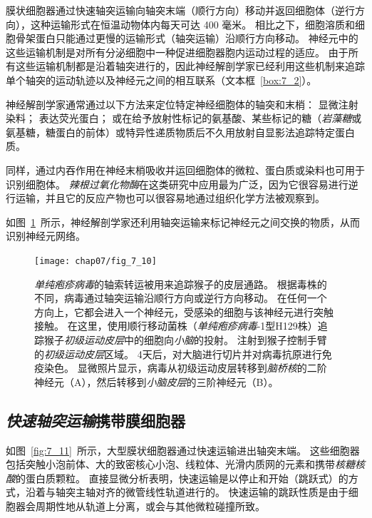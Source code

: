 膜状细胞器通过快速轴突运输向轴突末端（顺行方向）移动并返回细胞体（逆行方向），这种运输形式在恒温动物体内每天可达 400 毫米。
相比之下，细胞溶质和细胞骨架蛋白只能通过更慢的运输形式（轴突运输）沿顺行方向移动。
神经元中的这些运输机制是对所有分泌细胞中一种促进细胞器胞内运动过程的适应。
由于所有这些运输机制都是沿着轴突进行的，因此神经解剖学家已经利用这些机制来追踪单个轴突的运动轨迹以及神经元之间的相互联系（文本框~\ref{box:7_2}）。

\begin{proposition}[利用轴突运输进行神经解剖学追踪] \label{box:7_2}
	
	\quad \quad 神经解剖学家通常通过以下方法来定位特定神经细胞体的轴突和末梢：
	显微注射染料；
	表达荧光蛋白；
	或在给予放射性标记的氨基酸、某些标记的糖（\textit{岩藻糖}或氨基糖，糖蛋白的前体）或特异性递质物质后不久用放射自显影法追踪特定蛋白质。
	
	\quad \quad 同样，通过内吞作用在神经末梢吸收并运回细胞体的微粒、蛋白质或染料也可用于识别细胞体。
	\textit{辣根过氧化物酶}在这类研究中应用最为广泛，因为它很容易进行逆行运输，并且它的反应产物也可以很容易地通过组织化学方法被观察到。
	
	\quad \quad 如图~\ref{fig:7_10}~所示，神经解剖学家还利用轴突运输来标记神经元之间交换的物质，从而识别神经元网络。
	
\end{proposition}


\begin{figure}[htbp]
	\centering
	\texttt{[image: chap07/fig\_7\_10]}
	\caption{\textit{单纯疱疹病毒}的轴索转运被用来追踪猴子的皮层通路。
		根据毒株的不同，病毒通过轴突运输沿顺行方向或逆行方向移动。
		在任何一个方向上，它都会进入一个神经元，受感染的细胞与该神经元进行突触接触。
		在这里，使用顺行移动菌株（\textit{单纯疱疹病毒}-1型H129株）追踪猴子\textit{初级运动皮层}中的细胞向\textit{小脑}的投射。
		注射到猴子控制手臂的\textit{初级运动皮层}区域。
		4天后，对大脑进行切片并对病毒抗原进行免疫染色。
		显微照片显示，病毒从初级运动皮层转移到\textit{脑桥核}的二阶神经元（A），然后转移到\textit{小脑皮层}的三阶神经元（B）。}
	\label{fig:7_10}
\end{figure}



\subsection{\textit{快速轴突运输}携带膜细胞器}

如图~\ref{fig:7_11}~所示，大型膜状细胞器通过快速运输进出轴突末端。
这些细胞器包括突触小泡前体、大的致密核心小泡、线粒体、光滑内质网的元素和携带\textit{核糖核酸}的蛋白质颗粒。
直接显微分析表明，快速运输是以停止和开始（跳跃式）的方式，沿着与轴突主轴对齐的微管线性轨道进行的。
快速运输的跳跃性质是由于细胞器会周期性地从轨道上分离，或会与其他微粒碰撞所致。


